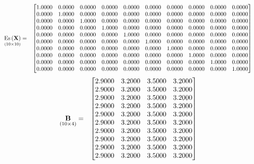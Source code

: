 \documentclass{glimmpse-report}
\begin{document}
\begin{eqnarray*}
\underset{\left(10\times10\right)}{\text{Es}\left(\mathbf{X}\right)} & = & \begin{bmatrix}1.0000 & 0.0000 & 0.0000 & 0.0000 & 0.0000 & 0.0000 & 0.0000 & 0.0000 & 0.0000 & 0.0000\protect\\
0.0000 & 1.0000 & 0.0000 & 0.0000 & 0.0000 & 0.0000 & 0.0000 & 0.0000 & 0.0000 & 0.0000\protect\\
0.0000 & 0.0000 & 1.0000 & 0.0000 & 0.0000 & 0.0000 & 0.0000 & 0.0000 & 0.0000 & 0.0000\protect\\
0.0000 & 0.0000 & 0.0000 & 1.0000 & 0.0000 & 0.0000 & 0.0000 & 0.0000 & 0.0000 & 0.0000\protect\\
0.0000 & 0.0000 & 0.0000 & 0.0000 & 1.0000 & 0.0000 & 0.0000 & 0.0000 & 0.0000 & 0.0000\protect\\
0.0000 & 0.0000 & 0.0000 & 0.0000 & 0.0000 & 1.0000 & 0.0000 & 0.0000 & 0.0000 & 0.0000\protect\\
0.0000 & 0.0000 & 0.0000 & 0.0000 & 0.0000 & 0.0000 & 1.0000 & 0.0000 & 0.0000 & 0.0000\protect\\
0.0000 & 0.0000 & 0.0000 & 0.0000 & 0.0000 & 0.0000 & 0.0000 & 1.0000 & 0.0000 & 0.0000\protect\\
0.0000 & 0.0000 & 0.0000 & 0.0000 & 0.0000 & 0.0000 & 0.0000 & 0.0000 & 1.0000 & 0.0000\protect\\
0.0000 & 0.0000 & 0.0000 & 0.0000 & 0.0000 & 0.0000 & 0.0000 & 0.0000 & 0.0000 & 1.0000\protect\\
\end{bmatrix}
\end{eqnarray*}
\begin{eqnarray*}
\underset{\left(10\times4\right)}{\mathbf{B}} & = & \begin{bmatrix}2.9000 & 3.2000 & 3.5000 & 3.2000\protect\\
2.9000 & 3.2000 & 3.5000 & 3.2000\protect\\
2.9000 & 3.2000 & 3.5000 & 3.2000\protect\\
2.9000 & 3.2000 & 3.5000 & 3.2000\protect\\
2.9000 & 3.2000 & 3.5000 & 3.2000\protect\\
2.9000 & 3.2000 & 3.5000 & 3.2000\protect\\
2.9000 & 3.2000 & 3.5000 & 3.2000\protect\\
2.9000 & 3.2000 & 3.5000 & 3.2000\protect\\
2.9000 & 3.2000 & 3.5000 & 3.2000\protect\\
2.9000 & 3.2000 & 3.5000 & 3.2000\protect\\
\end{bmatrix}
\end{eqnarray*}
\end{document}
